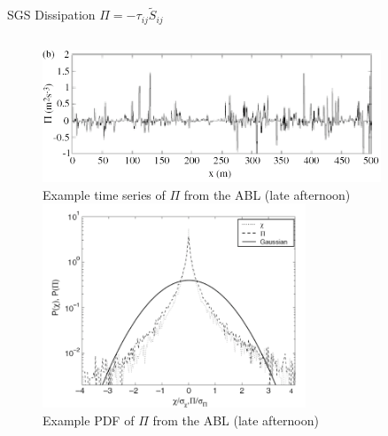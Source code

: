 \begin{frame}{SGS Dissipation $\Pi = -\tau_{ij}\widetilde{S}_{ij}$}
\begin{columns}
\begin{column}{.6\textwidth}
\begin{figure}
      \includegraphics[width=0.9\textwidth]{apriori3}
      ~\\\tiny{Example time series of $\Pi$ from the ABL (late afternoon)}
      ~\\\includegraphics[width=0.7\textwidth]{apriori4}
      ~\\\tiny{Example PDF of $\Pi$ from the ABL (late afternoon)}
      \end{figure}
    \end{column}
  \end{columns}
\end{frame}
